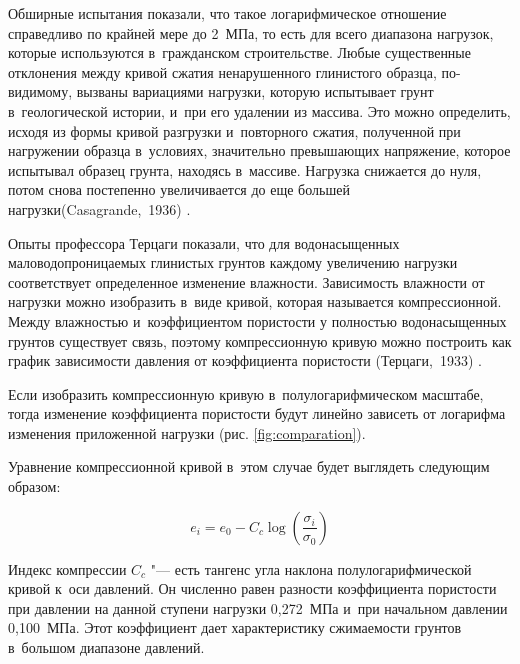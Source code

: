 Обширные испытания показали, что такое логарифмическое отношение справедливо по крайней мере до 2~МПа, то есть для всего диапазона нагрузок, которые используются в~гражданском строительстве.
Любые существенные отклонения между кривой сжатия ненарушенного глинистого образца, по-видимому, вызваны вариациями нагрузки, которую испытывает грунт в~геологической истории, и~при его удалении из массива.
Это можно определить, исходя из формы кривой разгрузки и~повторного сжатия, полученной при нагружении образца в~условиях, значительно превышающих напряжение, которое испытывал образец грунта, находясь в~массиве.
Нагрузка снижается до нуля, потом снова постепенно увеличивается до еще большей нагрузки(Casagrande,~1936) \cite{cazagrande1936}.

 Опыты профессора Терцаги показали, что для водонасыщенных маловодопроницаемых глинистых грунтов каждому увеличению нагрузки соответствует определенное изменение влажности. 
 Зависимость влажности от нагрузки можно изобразить в~виде кривой,
 которая называется компрессионной. 
 Между влажностью и~коэффициентом пористости у полностью водонасыщенных грунтов существует связь, поэтому компрессионную кривую можно построить как график зависимости давления от коэффициента пористости (Терцаги,~1933) \cite{terz1933}.



 Если изобразить компрессионную кривую в~полулогарифмическом масштабе, 
 тогда изменение коэффициента пористости будут линейно зависеть от логарифма изменения приложенной нагрузки (рис. \ref{fig:comparation}).

 \begin{sidewaysfigure}[p]
  \label{fig:comparation}
  \centering
  \small
  
  \caption{Сравнение компрессионой кривой в~линейном и~логарифмическом масштабе,(Casagrande, 1936) \cite{cazagrande1936}}
 \end{sidewaysfigure}


 Уравнение компрессионной кривой в~этом случае будет выглядеть следующим образом:
 
 \begin{equation}
 e_i=e_0-C_c \log \left( \frac{\sigma_i}{\sigma_0} \right)
 \label{eq:ke}
 \end{equation}
 
 Индекс компрессии $C_c$ "--- есть тангенс угла наклона полулогарифмической кривой к~оси давлений. Он численно равен разности коэффициента пористости при давлении на данной ступени нагрузки 0,272~МПа и~при начальном давлении 0,100~МПа. Этот коэффициент дает характеристику сжимаемости грунтов в~большом диапазоне давлений. 
 
